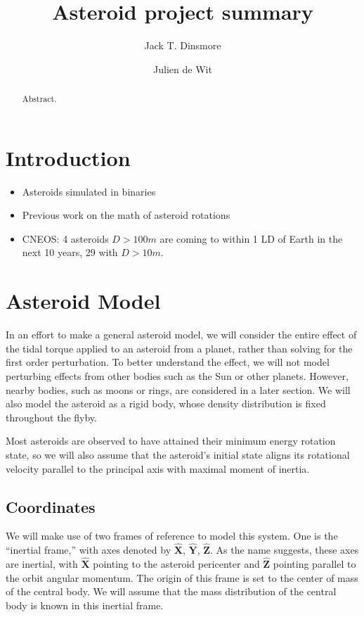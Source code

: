 \documentclass{aastex631}
\newcommand{\unit}[1]{\hat{\mathbf{#1}}}
\begin{document}
\title{Asteroid project summary}


\author[0000-0002-6401-778X]{Jack T. Dinsmore}

\author{Julien de Wit}

\begin{abstract}

Abstract. 
\end{abstract}




\section{Introduction}

\begin{itemize}
\item Asteroids simulated in binaries \cite{Naidu_2015}
\item Previous work on the math of asteroid rotations %
\item CNEOS: 4 asteroids $D > 100 m$ are coming to within 1 LD of Earth in the next 10 years, 29 with $D > 10 m$.
\end{itemize}


\section{Asteroid Model}
In an effort to make a general asteroid model, we will consider the entire effect of the tidal torque applied to an asteroid from a planet, rather than solving for the first order perturbation. To better understand the effect, we will not model perturbing effects from other bodies such as the Sun or other planets. However, nearby bodies, such as moons or rings, are considered in a later section. We will also model the asteroid as a rigid body, whose density distribution is fixed throughout the flyby.

Most asteroids are observed to have attained their minimum energy rotation state, so we will also assume that the asteroid's initial state aligns its rotational velocity parallel to the principal axis with maximal moment of inertia.

\subsection{Coordinates}
\label{sec:coordinates}
We will make use of two frames of reference to model this system. One is the ``inertial frame,'' with axes denoted by $\unit{X}$, $\unit{Y}$, $\unit{Z}$. As the name suggests, these axes are inertial, with $\unit{X}$ pointing to the asteroid pericenter and $\unit{Z}$ pointing parallel to the orbit angular momentum. The origin of this frame is set to the center of mass of the central body. We will assume that the mass distribution of the central body is known in this inertial frame.
\end{document}
